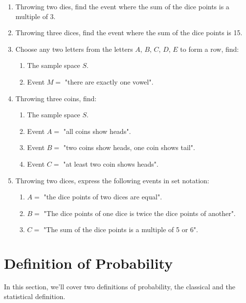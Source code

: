 \documentclass{report}
\begin{document}
\begin{multicols}{2}
\begin{enumerate}
    \item Throwing two dies, find the event where the sum of the dice points is a
          multiple of 3.

    \item Throwing three dices, find the event where the sum of the dice points is 15.

    \item Choose any two letters from the letters $A$, $B$, $C$, $D$, $E$ to form a row,
          find:
          \begin{enumerate}
            \item The sample space $S$.
            \item Event $M = $ "there are exactly one vowel".
          \end{enumerate}

    \item Throwing three coins, find:
          \begin{enumerate}
            \item The sample space $S$.
            \item Event $A = $ "all coins show heads".
            \item Event $B = $ "two coins show heads, one coin shows tail".
            \item Event $C = $ "at least two coin shows heads".
          \end{enumerate}

    \item Throwing two dices, express the following events in set notation:
          \begin{enumerate}
            \item $A = $ "the dice points of two dices are equal".
            \item $B = $ "The dice points of one dice is twice the dice points of another".
            \item $C = $ "The sum of the dice points is a multiple of 5 or 6".
          \end{enumerate}
  \end{enumerate}

  \section{Definition of Probability}

  In this section, we'll cover two definitions of probability, the classical and
  the statistical definition.


\end{multicols}
\end{document}
